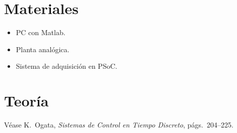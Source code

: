 \section{Materiales}
\begin{itemize}
	\item PC con Matlab.
	\item Planta analógica.
	\item Sistema de adquisición en PSoC.
\end{itemize}

\section{Teoría}
Véase K.~Ogata, \textit{Sistemas de Control en Tiempo Discreto}, págs.~204--225.

